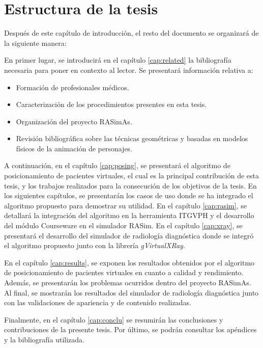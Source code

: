 \clearpage
\section{Estructura de la tesis}

Después de este capítulo de introducción, el resto del documento se organizará de la siguiente manera:

En primer lugar, se introducirá en el capítulo \ref{cap:related} la bibliografía necesaria para poner en contexto al lector. Se presentará información relativa a:
\begin{itemize}
    \item Formación de profesionales médicos.
    \item Caracterización de los procedimientos presentes en esta tesis.
    \item Organización del proyecto \acs{RASimAs}.
    \item Revisión bibliográfica sobre las técnicas geométricas y basadas en modelos físicos de la animación de personajes.
\end{itemize}

A continuación, en el capítulo \ref{cap:posing}, se presentará el algoritmo de posicionamiento de pacientes virtuales, el cual es la principal contribución de esta tesis, y los trabajos realizados para la consecución de los objetivos de la tesis. En los siguientes capítulos, se presentarán los casos de uso donde se ha integrado el algoritmo propuesto para demostrar su utilidad. En el capítulo \ref{cap:rasim}, se detallará la integración del algoritmo en la herramienta \acs{ITGVPH} y el desarrollo del módulo \acs{Courseware} en el simulador \acs{RASim}. En el capítulo \ref{cap:xray}, se presentará el desarrollo del simulador de radiología diagnóstica donde se integró el algoritmo propuesto junto con la librería \emph{gVirtualXRay}.

En el capítulo \ref{cap:results}, se exponen los resultados obtenidos por el algoritmo de posicionamiento de pacientes virtuales en cuanto a calidad y rendimiento. Además, se presentarán los problemas ocurridos dentro del proyecto \ac{RASimAs}. Al final, se mostrarán los resultados del simulador de radiología diagnóstica junto con las  validaciones de apariencia y de contenido realizadas. 

Finalmente, en el capítulo \ref{cap:conclu} se resumirán las conclusiones y contribuciones de la presente tesis. Por último, se podrán consultar los apéndices y la bibliografía utilizada.